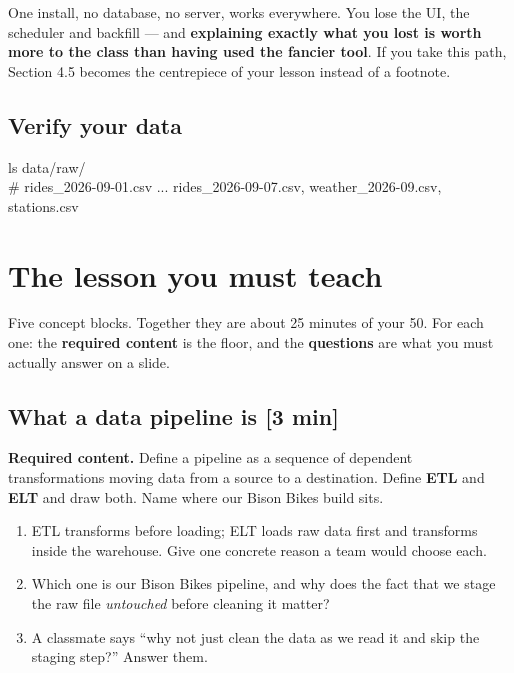 \documentclass[11pt]{article}
\newcommand{\key}[1]{\textcolor{accent}{\textbf{#1}}}
\newcommand{\tm}[1]{\textcolor{grayish}{\small\textsf{[#1]}}}
\begin{document}
\noindent
One install, no database, no server, works everywhere. You lose the UI, the
scheduler and backfill --- and \key{explaining exactly what you lost is worth
more to the class than having used the fancier tool}. If you take this path,
Section 4.5 becomes the centrepiece of your lesson instead of a footnote.

\subsection*{Verify your data}

\begin{codebox}
ls data/raw/\\
\# rides\_2026-09-01.csv ... rides\_2026-09-07.csv, weather\_2026-09.csv, stations.csv
\end{codebox}

\section{The lesson you must teach}

Five concept blocks. Together they are about 25 minutes of your 50. For each
one: the \textbf{required content} is the floor, and the \textbf{questions} are
what you must actually answer on a slide.

\subsection{What a data pipeline is \tm{3 min}}

\textbf{Required content.} Define a pipeline as a sequence of dependent
transformations moving data from a source to a destination. Define
\key{ETL} and \key{ELT} and draw both. Name where our Bison Bikes build sits.

\begin{qbox}
\begin{enumerate}
  \item ETL transforms before loading; ELT loads raw data first and transforms
        inside the warehouse. Give one concrete reason a team would choose each.
  \item Which one is our Bison Bikes pipeline, and why does the fact that we
        stage the raw file \emph{untouched} before cleaning it matter?
  \item A classmate says ``why not just clean the data as we read it and skip
        the staging step?'' Answer them.
\end{enumerate}
\end{qbox}
\end{document}
